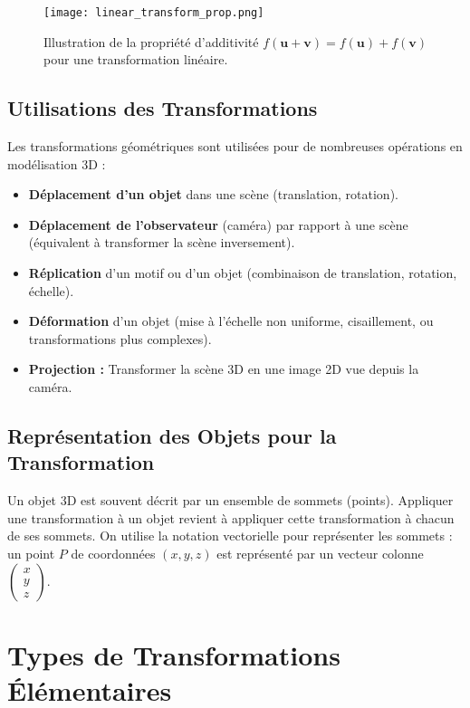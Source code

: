 \documentclass{article}
\begin{document}
\begin{figure}[H]
\centering
\texttt{[image: linear\_transform\_prop.png]}
\caption{Illustration de la propriété d'additivité $f(\mathbf{u}+\mathbf{v}) = f(\mathbf{u}) + f(\mathbf{v})$ pour une transformation linéaire.}
\label{fig:linear_prop}
\end{figure}


\subsection{Utilisations des Transformations}
Les transformations géométriques sont utilisées pour de nombreuses opérations en modélisation 3D :
\begin{itemize}
    \item \textbf{Déplacement d'un objet} dans une scène (translation, rotation).
    \item \textbf{Déplacement de l'observateur} (caméra) par rapport à une scène (équivalent à transformer la scène inversement).
    \item \textbf{Réplication} d'un motif ou d'un objet (combinaison de translation, rotation, échelle).
    \item \textbf{Déformation} d'un objet (mise à l'échelle non uniforme, cisaillement, ou transformations plus complexes).
    \item \textbf{Projection :} Transformer la scène 3D en une image 2D vue depuis la caméra.
\end{itemize}

\subsection{Représentation des Objets pour la Transformation}
Un objet 3D est souvent décrit par un ensemble de sommets (points). Appliquer une transformation à un objet revient à appliquer cette transformation à chacun de ses sommets. On utilise la notation vectorielle pour représenter les sommets : un point $P$ de coordonnées $(x, y, z)$ est représenté par un vecteur colonne $\begin{pmatrix} x \\ y \\ z \end{pmatrix}$.

\section{Types de Transformations Élémentaires}
\end{document}
